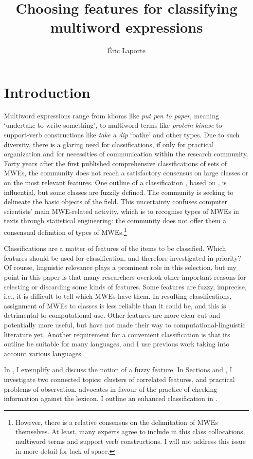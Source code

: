 \documentclass[output=paper]{langsci/langscibook}
\author{Éric Laporte\affiliation{Université Paris-Est, Laboratoire d’informatique Gaspard-Monge CNRS UMR\newline 8049, F77454 Marne-la-Vallée, France}}
\title{Choosing features for classifying multiword expressions}
\begin{document}
\section{Introduction}

Multiword expressions range from idioms like \textit{put pen to paper}, meaning ‘undertake to write something’, to multiword terms like \textit{protein kinase} to support-verb constructions like \textit{take a dip} ‘bathe’ and other types. Due to such diversity, there is a glaring need for classifications, if only for practical organization and for necessities of communication within the research community. Forty years after the first published comprehensive classifications of sets of MWEs, the community does not reach a satisfactory consensus on large classes or on the most relevant features. One outline of a classification \citep{Sag:2002}, based on \cite{Nunberg1994}, is influential, but some classes are fuzzily defined. The community is seeking to delineate the basic objects of the field. This uncertainty confuses computer scientists’ main MWE-related activity, which is to recognise types of MWEs in texts through statistical engineering: the community does not offer them a consensual definition of types of MWEs.\footnote{ However, there is a relative consensus on the delimitation of MWEs themselves. At least, many experts agree to include in this class collocations, multiword terms and support verb constructions. I will not address this issue in more detail for lack of space.}

Classifications are a matter of features of the items to be classified. Which features should be used for classification, and therefore investigated in priority? Of course, linguistic relevance plays a prominent role in this selection, but my point in this paper is that many researchers overlook other important reasons for selecting or discarding some kinds of features. Some features are fuzzy, imprecise, i.e., it is difficult to tell which MWEs have them. In resulting classifications, assignment of MWEs to classes is less reliable than it could be, and this is detrimental to computational use. Other features are more clear-cut and potentially more useful, but have not made their way to computational-linguistic literature yet. Another requirement for a convenient classification is that its outline be suitable for many languages, and I use previous work taking into account various languages.

In , I exemplify and discuss the notion of a fuzzy feature. In Sections  and , I investigate two connected topics: clusters of correlated features, and practical problems of observation.  advocates in favour of the practice of checking information against the lexicon. I outline an enhanced classification in .
\end{document}
